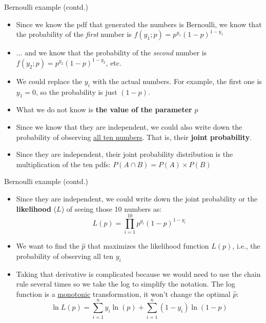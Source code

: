 \documentclass[notes,10pt, aspectratio=169]{beamer}
\begin{document}
\begin{frame}{Bernoulli example (contd.)}
  \begin{itemize}
    \item Since we know the pdf that generated the numbers is Bernoulli, we know that the probability of the \textit{first} number is $f(y_1; p) = p^{y_1} (1 - p)^{1-{y_1}}$\\[1em]
    \item ... and we know that the probability of the \textit{second}  number is $f(y_2; p) = p^{y_2} (1 - p)^{1-{y_2}}$, etc.\\[1em]
    \item We could replace the $y_i$ with the actual numbers. For example, the first one is $y_1 = 0$, so the probability is just $(1-p)$.\\[1em]
    \item What we do not know is \textbf{the value of the parameter} $p$\\[1em]
    \item Since we know that they are independent, we could also write down the probability of observing \underline{all ten numbers}. That is, their \textbf{joint probability}.\\[1em]
    \item Since they are independent, their joint probability distribution is the multiplication of the ten pdfs: $P(A\cap B) = P(A) \times P(B)$
  \end{itemize}
\end{frame}


\begin{frame}{Bernoulli example (contd.)}
  \begin{itemize}
    \item Since they are independent, we could write down the joint probability or the \textbf{likelihood} ($L$) of seeing those 10 numbers as:
    \[ L(p) = \prod_{i=1}^{10} p^{y_i} (1 - p)^{1 - y_i} \]
    \item We want to find the $\hat{p}$ that maximizes the likelihood function $L(p)$, i.e., the probability of observing all ten $y_i$\\[1em]
    \item Taking that derivative is complicated because we would need to use the chain rule several times so we take the log to simplify the notation. The log function is a \underline{monotonic} transformation, it won’t change the optimal $\hat{p}$:
    \[ \ln L(p) = \sum_{i=1}^{n} y_i \ln(p) + \sum_{i=1}^{n} (1 - y_i) \ln(1 - p) \]
  \end{itemize}
\end{frame}
\end{document}
